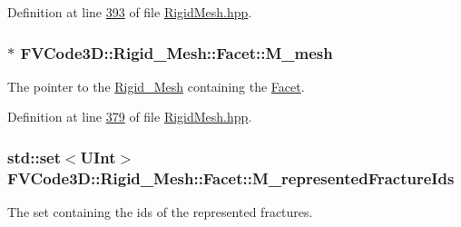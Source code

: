 Definition at line \hyperlink{RigidMesh_8hpp_source_l00393}{393} of file \hyperlink{RigidMesh_8hpp_source}{Rigid\+Mesh.\+hpp}.

\subsubsection[{\texorpdfstring{M\+\_\+mesh}{M_mesh}}]{$\ast$ F\+V\+Code3\+D\+::\+Rigid\+\_\+\+Mesh\+::\+Facet\+::\+M\+\_\+mesh\hspace{0.3cm}{\ttfamily [protected]}}\hypertarget{classFVCode3D_1_1Rigid__Mesh_1_1Facet_af220d353a3aad7de9b1fa293ac594893}{}\label{classFVCode3D_1_1Rigid__Mesh_1_1Facet_af220d353a3aad7de9b1fa293ac594893}


The pointer to the \hyperlink{classFVCode3D_1_1Rigid__Mesh}{Rigid\+\_\+\+Mesh} containing the \hyperlink{classFVCode3D_1_1Rigid__Mesh_1_1Facet}{Facet}. 



Definition at line \hyperlink{RigidMesh_8hpp_source_l00379}{379} of file \hyperlink{RigidMesh_8hpp_source}{Rigid\+Mesh.\+hpp}.

\subsubsection[{\texorpdfstring{M\+\_\+represented\+Fracture\+Ids}{M_representedFractureIds}}]{\setlength{\rightskip}{0pt plus 5cm}std\+::set$<${\bf U\+Int}$>$ F\+V\+Code3\+D\+::\+Rigid\+\_\+\+Mesh\+::\+Facet\+::\+M\+\_\+represented\+Fracture\+Ids\hspace{0.3cm}{\ttfamily [protected]}}\hypertarget{classFVCode3D_1_1Rigid__Mesh_1_1Facet_a95681de925b4e9f6bfbcb239712aede2}{}\label{classFVCode3D_1_1Rigid__Mesh_1_1Facet_a95681de925b4e9f6bfbcb239712aede2}


The set containing the ids of the represented fractures. 



